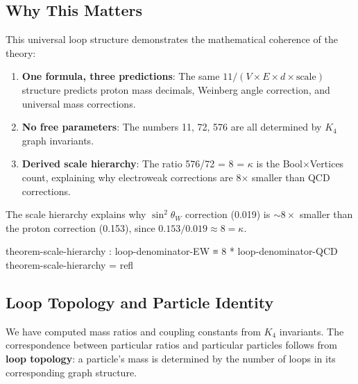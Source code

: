 \documentclass[11pt,a4paper]{book}
\begin{document}
\subsection{Why This Matters}

This universal loop structure demonstrates the mathematical coherence of the theory:

\begin{enumerate}
\item \textbf{One formula, three predictions}: The same $11/(V \times E \times d \times \text{scale})$ structure predicts proton mass decimals, Weinberg angle correction, and universal mass corrections.

\item \textbf{No free parameters}: The numbers 11, 72, 576 are all determined by $K_4$ graph invariants.

\item \textbf{Derived scale hierarchy}: The ratio 576/72 = 8 = $\kappa$ is the Bool$\times$Vertices count, explaining why electroweak corrections are 8× smaller than QCD corrections.
\end{enumerate}

The scale hierarchy explains why $\sin^2\theta_W$ correction (0.019) is $\sim 8\times$ smaller than the proton correction (0.153), since $0.153 / 0.019 \approx 8 = \kappa$.

\begin{code}
theorem-scale-hierarchy : loop-denominator-EW ≡ 8 * loop-denominator-QCD
theorem-scale-hierarchy = refl
\end{code}

\subsection{Loop Topology and Particle Identity}

We have computed mass ratios and coupling constants from $K_4$ invariants. The correspondence between particular ratios and particular particles follows from \textbf{loop topology}: a particle's mass is determined by the number of loops in its corresponding graph structure.
\end{document}
